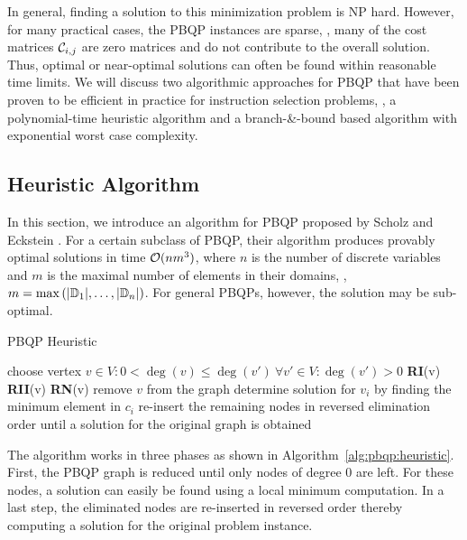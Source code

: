 In general, finding a solution to this minimization problem is NP
hard.  However, for many practical cases, the PBQP instances are
sparse, \ie, many of the cost matrices ${\mathcal C}_{i,j}$ are
zero matrices and do not contribute to the overall solution. Thus,
optimal or near-optimal solutions can often be found within reasonable
time limits.
We will discuss two algorithmic approaches for PBQP that have been
proven to be efficient in practice for instruction selection problems,
\ie, a polynomial-time heuristic algorithm and a branch-\&-bound based
algorithm with exponential worst case complexity.

\subsection{Heuristic Algorithm}
\label{sec:pbqp:heuristic}
In this section, we introduce an algorithm for PBQP proposed by
Scholz and Eckstein \cite{ScholzE02,Eck03}.  For a certain subclass of
PBQP, their algorithm produces provably optimal solutions in time
${\cal O}(n m^3)$, where $n$ is the number of discrete variables and
$m$ is the maximal number of elements in their domains, \ie, $m=\max
\left(|\mathbb D_1|,\ldots,|\mathbb D_n\right|)$. For general
{PBQP}s, however, the solution may be sub-optimal.

\begin{algorithm}
\caption{PBQP Heuristic}
\label{alg:pbqp:heuristic}
\begin{algorithmic}
  \STATE {}
  \STATE choose vertex $v \in V: 0 < \deg (v) \leq \deg (v') \ \forall v'
  \in V : \deg(v') > 0$
  \STATE \textbf{RI}(v)
  \STATE \textbf{RII}(v)
  \ELSE
  \STATE \textbf{RN}(v) 
  \ENDIF
  \STATE remove $v$ from the graph
  \ENDWHILE
  \STATE
  \STATE {}
  \STATE determine solution for $v_i$ by finding the minimum element
  in $c_i$
  \ENDFOR
  \STATE
  \STATE {}
  \STATE re-insert the remaining nodes in reversed elimination order
  until a solution for the original graph is obtained
\end{algorithmic}
\end{algorithm}
The algorithm works in three phases as shown in
Algorithm~\ref{alg:pbqp:heuristic}. First, the PBQP graph is reduced
until only nodes of degree $0$ are left. For these nodes, a solution
can easily be found using a local minimum computation. In a last step,
the eliminated nodes are re-inserted in reversed order thereby
computing a solution for the original problem instance.

